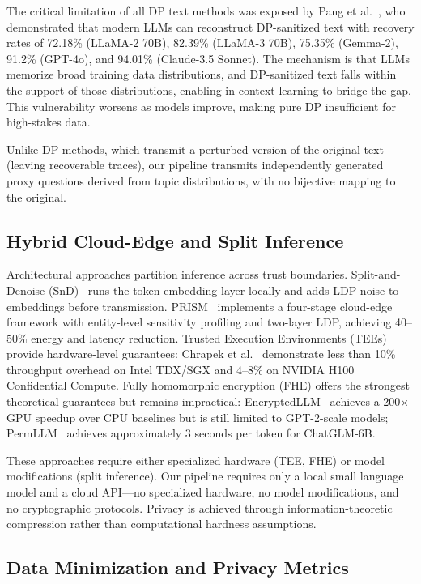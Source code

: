 \documentclass[sigconf,anonymous,review,balance=false]{acmart}
\begin{document}
The critical limitation of all DP text methods was exposed by Pang et al.~\cite{pang2024}, who demonstrated that modern LLMs can reconstruct DP-sanitized text with recovery rates of 72.18\% (LLaMA-2 70B), 82.39\% (LLaMA-3 70B), 75.35\% (Gemma-2), 91.2\% (GPT-4o), and 94.01\% (Claude-3.5 Sonnet).
The mechanism is that LLMs memorize broad training data distributions, and DP-sanitized text falls within the support of those distributions, enabling in-context learning to bridge the gap.
This vulnerability worsens as models improve, making pure DP insufficient for high-stakes data.

Unlike DP methods, which transmit a perturbed version of the original text (leaving recoverable traces), our pipeline transmits independently generated proxy questions derived from topic distributions, with no bijective mapping to the original.

\subsection{Hybrid Cloud-Edge and Split Inference}
\label{sec:rw-split}

Architectural approaches partition inference across trust boundaries.
Split-and-Denoise (SnD)~\cite{snd2023} runs the token embedding layer locally and adds LDP noise to embeddings before transmission.
PRISM~\cite{zhan2025} implements a four-stage cloud-edge framework with entity-level sensitivity profiling and two-layer LDP, achieving 40--50\% energy and latency reduction.
Trusted Execution Environments (TEEs) provide hardware-level guarantees: Chrapek et al.~\cite{chrapek2025} demonstrate less than 10\% throughput overhead on Intel TDX/SGX and 4--8\% on NVIDIA H100 Confidential Compute.
Fully homomorphic encryption (FHE) offers the strongest theoretical guarantees but remains impractical: EncryptedLLM~\cite{decastro2025} achieves a 200$\times$ GPU speedup over CPU baselines but is still limited to GPT-2-scale models; PermLLM~\cite{zheng2024} achieves approximately 3 seconds per token for ChatGLM-6B.

These approaches require either specialized hardware (TEE, FHE) or model modifications (split inference).
Our pipeline requires only a local small language model and a cloud API---no specialized hardware, no model modifications, and no cryptographic protocols.
Privacy is achieved through information-theoretic compression rather than computational hardness assumptions.

\subsection{Data Minimization and Privacy Metrics}
\label{sec:rw-minimization}
\end{document}
